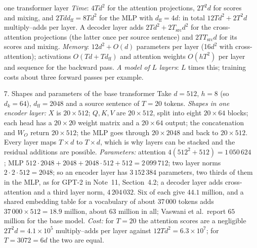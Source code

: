 \documentclass[11pt]{article}
\begin{document}
\begin{runtime}{one transformer layer}
\emph{Time}: $4Td^2$ for the attention projections, $2T^2d$ for scores and mixing, and $2Tdd_{\mathrm{ff}} = 8Td^2$ for the
MLP with $d_{\mathrm{ff}} = 4d$: in total $12Td^2 + 2T^2d$ multiply--adds per layer. A decoder layer adds
$2Td^2 + 2T_{\mathrm{src}}d^2$ for the cross-attention projections (the latter once per source sentence) and
$2TT_{\mathrm{src}}d$ for its scores and mixing.
\emph{Memory}: $12d^2 + O(d)$ parameters per layer (16$d^2$ with cross-attention); activations $O(Td + Td_{\mathrm{ff}})$
and attention weights $O(hT^2)$ per layer and sequence for the backward pass. \emph{A model of $L$ layers}: $L$ times
this; training costs about three forward passes per example.
\end{runtime}

\begin{worked}{7. Shapes and parameters of the base transformer}
Take $d = 512$, $h = 8$ (so $d_k = 64$), $d_{\mathrm{ff}} = 2048$ and a source sentence of $T = 20$ tokens.
\emph{Shapes in one encoder layer:} $X$ is $20 \times 512$; $Q, K, V$ are $20 \times 512$, split into eight $20 \times 64$
blocks; each head has a $20 \times 20$ weight matrix and a $20 \times 64$ output; the concatenation and $W_O$ return
$20 \times 512$; the MLP goes through $20 \times 2048$ and back to $20 \times 512$. Every layer maps $T \times d$ to
$T \times d$, which is why layers can be stacked and the residual additions are possible.
\emph{Parameters:} attention $4(512^2 + 512) = 1\,050\,624$; MLP $512 \cdot 2048 + 2048 + 2048 \cdot 512 + 512 =
2\,099\,712$; two layer norms $2 \cdot 2 \cdot 512 = 2048$; so an encoder layer has $3\,152\,384$ parameters, two thirds of them in the MLP, as for GPT-2 in Note~11, Section~4.2;
a decoder layer adds cross-attention and a
third layer norm, $4\,204\,032$. Six of each give $44.1$ million, and a shared embedding table for a vocabulary of about
$37\,000$ tokens adds $37\,000 \times 512 = 18.9$ million, about $63$ million in all; Vaswani et al.\ report $65$ million for
the base model.
\emph{Cost:} for $T = 20$ the attention scores are a negligible $2T^2d = 4.1 \times 10^5$ multiply--adds per layer against
$12Td^2 = 6.3 \times 10^7$; for $T = 3072 = 6d$ the two are equal.
\end{worked}
\end{document}
